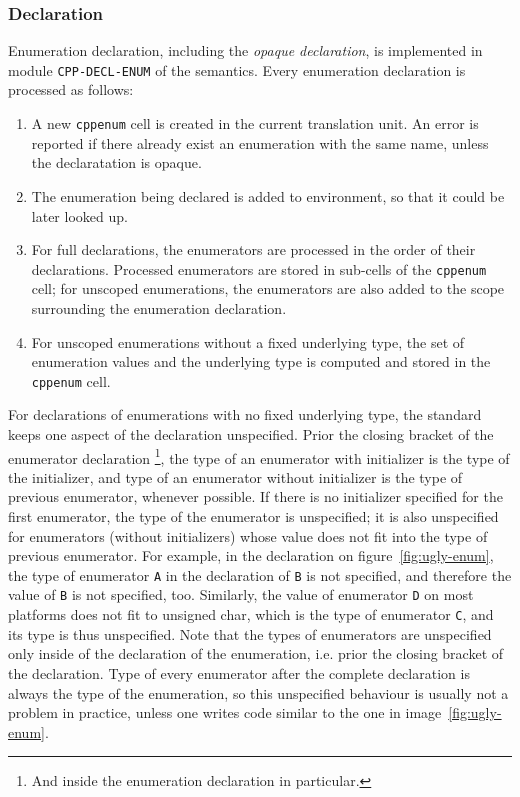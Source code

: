 \documentclass{fithesis3}
\begin{document}

\subsubsection{Declaration}

Enumeration declaration, including the \textit{opaque declaration}, is implemented in module \texttt{CPP-DECL-ENUM} of the semantics.
Every enumeration declaration is processed as follows:
\begin{enumerate}
\item A new \texttt{cppenum} cell is created in the current translation unit. An error is reported if there already exist an enumeration with the same name, unless the declaratation is opaque.
\item The enumeration being declared is added to environment, so that it could be later looked up.
\item For full declarations, the enumerators are processed in the order of their declarations. Processed enumerators are stored in sub-cells of the \texttt{cppenum} cell; for unscoped enumerations, the enumerators are also added to the scope surrounding the enumeration declaration.
\item For unscoped enumerations without a fixed underlying type, the set of enumeration values and the underlying type is computed and stored in the \texttt{cppenum} cell.
\end{enumerate}

For declarations of enumerations with no fixed underlying type, the standard keeps one aspect of the declaration unspecified. Prior the closing bracket of the enumerator declaration
\footnote{And inside the enumeration declaration in particular.},
the type of an enumerator with initializer is the type of the initializer, and type of an enumerator without initializer is the type of previous enumerator, whenever possible. If there is no initializer specified for the first enumerator, the type of the enumerator is unspecified; it is also unspecified for enumerators (without initializers) whose value does not fit into the type of previous enumerator. 
For example, in the declaration on figure~\ref{fig:ugly-enum}, the type of enumerator \lstinline{A} in the declaration of \lstinline{B} is not specified, and therefore the value of \lstinline{B} is not specified, too. Similarly, the value of enumerator \lstinline{D} on most platforms does not fit to unsigned char, which is the type of enumerator \lstinline{C}, and its type is thus unspecified. Note that the types of enumerators are unspecified only inside of the declaration of the enumeration, i.e. prior the closing bracket of the declaration. Type of every enumerator after the complete declaration is always the type of the enumeration, so this unspecified behaviour is usually not a problem in practice, unless one writes code similar to the one in image~\ref{fig:ugly-enum}.
\end{document}

